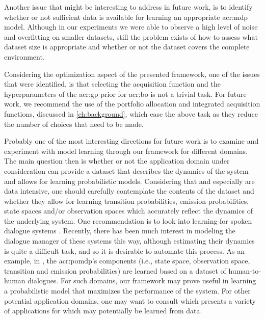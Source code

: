 Another issue that might be interesting to address in future work, is to identify whether or not sufficient data is available for learning an appropriate \acrshort{acr:mdp} model.
Although in our experiments we were able to observe a high level of noise and overfitting on smaller datasets, still the problem exists of how to assess what dataset size is appropriate and whether or not the dataset covers the complete environment.

Considering the optimization aspect of the presented framework, one of the issues that were identified, is that selecting the acquisition function and the hyperparameters of the \acrshort{acr:gp} prior for \acrshort{acr:bo} is not a trivial task.
For future work, we recommend the use of the portfolio allocation \cite{Hoffman2011, shahriari2016taking} and integrated acquisition \cite{snoek2012practical} functions, discussed in \autoref{ch:background}, which ease the above task as they reduce the number of choices that need to be made.

\newpage

Probably one of the most interesting directions for future work is to examine and experiment with model learning through our framework for different domains.
The main question then is whether or not the application domain under consideration can provide a dataset that describes the dynamics of the system and allows for learning probabilistic models.
Considering that  and especially  are data intensive, one should carefully contemplate the contents of the dataset and whether they allow for learning transition probabilities, emission probabilities, state spaces and/or observation spaces which accurately reflect the dynamics of the underlying system.
One recommendation is to look into learning  for spoken dialogue systems \cite{chinaei2011, png2011bayesian, young2016}.
Recently, there has been much interest in modeling the dialogue manager of these systems this way, although estimating their dynamics is quite a difficult task, and so it is desirable to automate this process.
As an example, in \cite{chinaei2011}, the \acrshort{acr:pomdp}'s components (i.e., state space, observation space, transition and emission probabilities) are learned based on a dataset of human-to-human dialogues.
For such domains, our framework may prove useful in learning a probabilistic model that maximizes the performance of the system.
For other potential application domains, one may want to consult \cite{cassandra1998spa} which presents a variety of applications for  which may potentially be learned from data.


